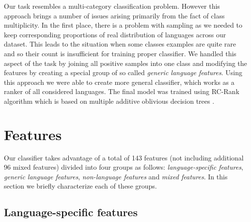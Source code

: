 \documentclass{acm_proc_article-sp}
\begin{document}
  Our task resembles a multi-category classification problem. 
  However this approach brings a number of issues arising primarily from the fact of class multiplicity. 
  In the first place, there is a problem with sampling as we needed to keep corresponding proportions 
  of real distribution of languages across our dataset. 
  This leads to the situation when some classes examples are quite rare and so their count is insufficient 
  for training proper classifier. We handled this aspect of the task by joining all positive samples 
  into one class and modifying the features by creating a special group of so called \textit{generic language features}. 
  Using this approach we were able to create more general classifier, which works as a ranker of all considered languages. 
  The final model was trained using RC-Rank algorithm which is based on multiple additive oblivious decision trees \cite{maimon:datamining}. 

  \section{Features}
  Our classifier takes advantage of a total of 143 features (not including additional 96 mixed features) divided into four groups
  as follows: \textit{language-specific features}, \textit{generic language features}, \textit{non-language
  features} and \textit{mixed features}. In this section we briefly characterize each of these
  groups.

\subsection{Language-specific features}
\end{document}
